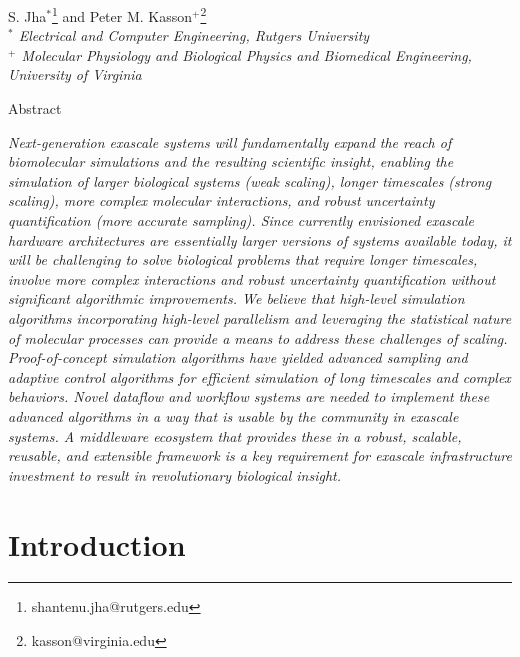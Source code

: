 \documentclass[10pt,letterpaper,draft]{article}
\begin{document}
\thispagestyle{empty}
\begin{center} 

\vspace{0.25in}
\large S. Jha$^{*}$\footnote{shantenu.jha@rutgers.edu} and Peter M. Kasson$^{+}$\footnote{kasson@virginia.edu}\\

\small {\it $^*$ Electrical and Computer Engineering, Rutgers University} \\
\small {\it $^+$ Molecular Physiology and Biological Physics and Biomedical
  Engineering, University of Virginia} \\

\vspace{0.25in}

\large Abstract

\end{center} {\it Next-generation exascale systems will fundamentally expand the reach of biomolecular simulations and the resulting scientific insight, enabling the simulation of larger biological systems (weak scaling), longer timescales (strong scaling), more complex molecular interactions, and robust uncertainty quantification (more accurate sampling).  Since currently envisioned exascale hardware architectures are essentially larger versions of systems available today, it will be challenging to solve biological problems that require longer timescales, involve more complex interactions and robust uncertainty quantification without significant algorithmic improvements.  We believe that high-level simulation algorithms incorporating high-level parallelism and leveraging the statistical nature of molecular processes can provide a means to address these challenges of scaling.  Proof-of-concept simulation algorithms have yielded advanced sampling and adaptive control algorithms for efficient simulation of long timescales and complex behaviors. Novel dataflow and workflow systems are needed to implement these advanced algorithms in a way that is usable by the community in exascale systems. A middleware ecosystem that provides these in a robust, scalable, reusable, and extensible framework is a key requirement for exascale infrastructure investment to result in revolutionary biological insight.  }

\vspace{0.15in}

\section*{Introduction}
\end{document}
